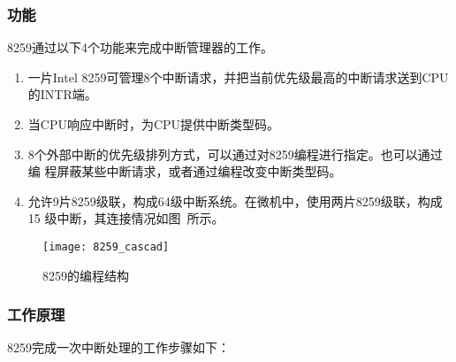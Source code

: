 \subsubsection{功能}
\label{subsubsec:8259_function}

8259通过以下4个功能来完成中断管理器的工作。

\begin{enumerate}[(1)]
	\item 一片Intel 8259可管理8个中断请求，并把当前优先级最高的中断请求送到CPU
	的INTR端。
	\item 当CPU响应中断时，为CPU提供中断类型码。
	\item 8个外部中断的优先级排列方式，可以通过对8259编程进行指定。也可以通过编
	程屏蔽某些中断请求，或者通过编程改变中断类型码。
	\item 允许9片8259级联，构成64级中断系统。在微机中，使用两片8259级联，构成15
	级中断，其连接情况如图~所示。
\end{enumerate}

\begin{figure}[H]
	\centering
	\texttt{[image: 8259\_cascad]}
	\caption{8259的编程结构}
	\label{fig:8259_cascad}
\end{figure}

\subsubsection{工作原理}
\label{subsubsec:8259_work}

8259完成一次中断处理的工作步骤如下：

